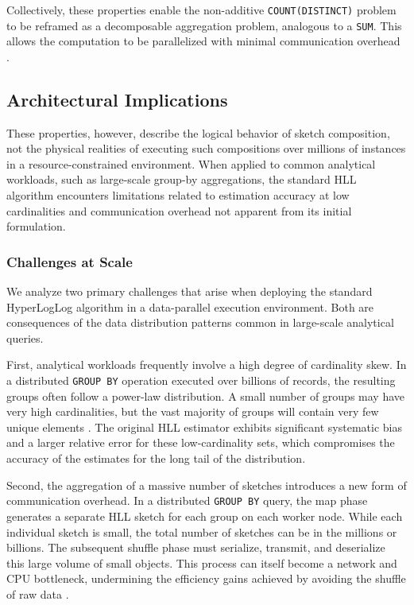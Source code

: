 Collectively, these properties enable the non-additive \texttt{COUNT(DISTINCT)} problem to be reframed as a decomposable aggregation problem, analogous to a \texttt{SUM}. This allows the computation to be parallelized with minimal communication overhead \cite{Zaharia2012ResilientDD}.

\subsection{Architectural Implications}

These properties, however, describe the logical behavior of sketch composition, not the physical realities of executing such compositions over millions of instances in a resource-constrained environment. When applied to common analytical workloads, such as large-scale group-by aggregations, the standard HLL algorithm encounters limitations related to estimation accuracy at low cardinalities and communication overhead not apparent from its initial formulation.

\subsubsection{Challenges at Scale}

We analyze two primary challenges that arise when deploying the standard HyperLogLog algorithm in a data-parallel execution environment. Both are consequences of the data distribution patterns common in large-scale analytical queries.

First, analytical workloads frequently involve a high degree of cardinality skew. In a distributed \texttt{GROUP BY} operation executed over billions of records, the resulting groups often follow a power-law distribution. A small number of groups may have very high cardinalities, but the vast majority of groups will contain very few unique elements \cite{Heule2013HyperLogLogIP}. The original HLL estimator exhibits significant systematic bias and a larger relative error for these low-cardinality sets, which compromises the accuracy of the estimates for the long tail of the distribution.

Second, the aggregation of a massive number of sketches introduces a new form of communication overhead. In a distributed \texttt{GROUP BY} query, the map phase generates a separate HLL sketch for each group on each worker node. While each individual sketch is small, the total number of sketches can be in the millions or billions. The subsequent shuffle phase must serialize, transmit, and deserialize this large volume of small objects. This process can itself become a network and CPU bottleneck, undermining the efficiency gains achieved by avoiding the shuffle of raw data \cite{Heule2013HyperLogLogIP}.
%


